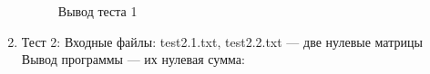 \documentclass[12pt, a4paper]{article}
\begin{document}
\begin{enumerate}
\begin{figure}[h]
  		\caption{Вывод теста 1}
	\end{figure}
	\newpage
	\item Тест 2: Входные файлы: test2.1.txt, 
	test2.2.txt --- две нулевые матрицы\\
	Вывод программы --- их нулевая сумма:
	\begin{figure}[h]

\end{figure}
\end{enumerate}
\end{document}
